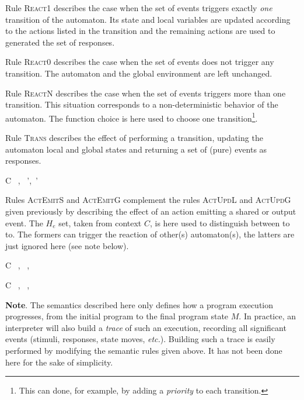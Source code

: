 Rule \textsc{React1} describes the case when the set of events triggers exactly \emph{one} transition
of the automaton. Its state and local variables are updated according to the actions listed in the
transition and the remaining actions are used to generated the set of responses.

Rule \textsc{React0} describes the case when the set of events does not trigger any transition. The
automaton and the global environment are left unchanged.

Rule \textsc{ReactN} describes the case when the set of events triggers more than one transition. This
situation corresponds to a non-deterministic behavior of the automaton. The
function \textsf{choice} is here used to choose one transition\footnote{This can done, for example,
  by adding a \emph{priority} to each transition.}. 

\medskip \step
Rule \textsc{Trans} describes the effect of performing a transition, updating the automaton local
and global states and returning a set of (pure) events as responses.

{C \vdash\ \mu,\ \env {} \mu',\ \env'}

\medskip\step Rules \textsc{ActEmitS} and \textsc{ActEmitG} complement the rules \textsc{ActUpdL} and \textsc{ActUpdG}
given previously by describing the effect of an action emitting a shared or output event. The
$H_e$ set, taken from context $C$, is here used to distinguish between to to. The formers can trigger the reaction of other(s)
automaton(s), the latters are just ignored here (see note below).

\begin{multicols}{2}
{C \vdash\ \vars,\ \env {} \vars,\ \env}

{C \vdash\ \vars,\ \env {} \vars,\ \env}
\end{multicols}

\bigskip
\textbf{Note}.
The semantics described here only defines how a program execution progresses, from the initial
program to the final program state $M$. In practice, an interpreter will also build a \emph{trace}
of such an execution, recording all significant events (stimuli, responses, state moves,
\emph{etc.}). Building such a trace is easily performed by modifying the semantic rules given above. It
has not been done here for the sake of simplicity.

